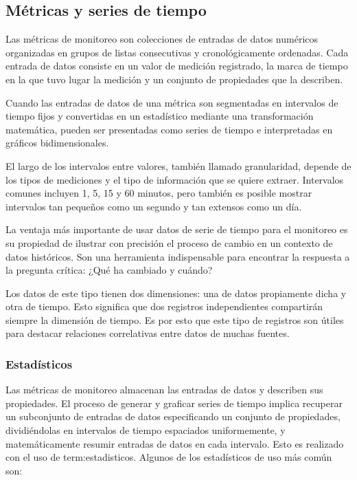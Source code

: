\subsection{Métricas y series de tiempo}
\label{metricas-y-timeseries}

Las métricas de monitoreo son colecciones de entradas de datos numéricos
organizadas en grupos de listas consecutivas y cronológicamente ordenadas. Cada
entrada de datos consiste en un valor de medición registrado, la marca de
tiempo en la que tuvo lugar la medición y un conjunto de propiedades que la
describen.

Cuando las entradas de datos de una métrica son segmentadas en intervalos de
tiempo fijos y convertidas en un estadístico mediante una transformación
matemática, pueden ser presentadas como series de tiempo e interpretadas en
gráficos bidimensionales.

El largo de los intervalos entre valores, también llamado granularidad, depende
de los tipos de mediciones y el tipo de información que se quiere extraer.
Intervalos comunes incluyen 1, 5, 15 y 60 minutos, pero también es posible
mostrar intervalos tan pequeños como un segundo y tan extensos como un día.

La ventaja más importante de usar datos de serie de tiempo para el monitoreo es
su propiedad de ilustrar con precisión el proceso de cambio en un contexto de
datos históricos. Son una herramienta indispensable para encontrar la respuesta
a la pregunta crítica: ¿Qué ha cambiado y cuándo?

Los datos de este tipo tienen dos dimensiones: una de datos propiamente dicha y
otra de tiempo. Esto significa que dos registros independientes compartirán
siempre la dimensión de tiempo. Es por esto que este tipo de registros son
útiles para destacar relaciones correlativas entre datos de muchas fuentes.

\subsubsection*{Estadísticos}
\label{estadisticos}

Las métricas de monitoreo almacenan las entradas de datos y describen sus
propiedades. El proceso de generar y graficar series de tiempo implica
recuperar un subconjunto de entradas de datos especificando un conjunto de
propiedades, dividiéndolas en intervalos de tiempo espaciados uniformemente, y
matemáticamente resumir entradas de datos en cada intervalo. Esto es realizado
con el uso de \glspl{term:estadistico}. Algunos de los estadísticos de uso más
común son:

